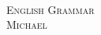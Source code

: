 \begin{center}
\LARGE{\textsc{ \\
English Grammar}} \\
\vspace{2.3cm}
\Large{\textsc{Michael}} \\
\vspace{2.3cm}
\end{center}
